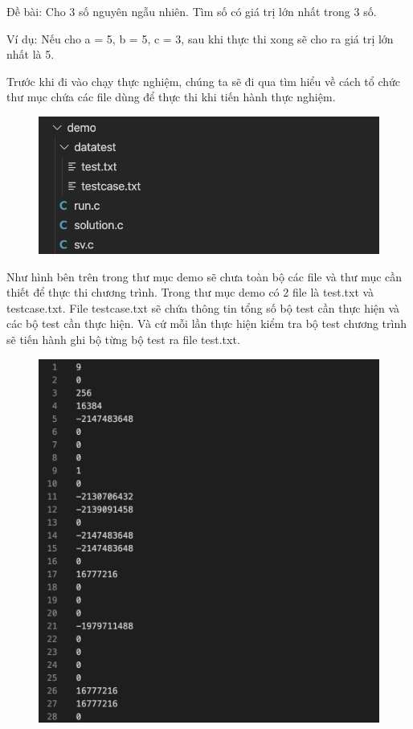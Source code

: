 \documentclass[12pt,a4paper]{article}
\begin{document}
Đề bài: Cho 3 số nguyên ngẫu nhiên. Tìm số có giá trị lớn nhất trong 3 số.

Ví dụ: Nếu cho a = 5, b = 5, c = 3, sau khi thực thi xong sẽ cho ra giá trị lớn nhất là 5.

Trước khi đi vào chạy thực nghiệm, chúng ta sẽ đi qua tìm hiểu về cách tổ chức thư mục chứa các file dùng để thực thi khi tiến hành thực nghiệm.

\begin{figure}[ht]
\begin{center}
\includegraphics[scale=.3]{hinhanh/cautrucfolder.png}
\end{center}
\end{figure}

Như hình bên trên trong thư mục demo sẽ chưa toàn bộ các file và thư mục cần thiết để thực thi chương trình. Trong thư mục demo có 2 file là test.txt và testcase.txt. File testcase.txt sẽ chứa thông tin tổng số bộ test cần thực hiện và các bộ test cần thực hiện. Và cứ mỗi lần thực hiện kiểm tra bộ test chương trình sẽ tiến hành ghi bộ từng bộ test ra file test.txt.

\begin{figure}[ht]
\begin{center}
\includegraphics[scale=.3]{hinhanh/testcase.png}
\end{center}
\end{figure}
\end{document}
